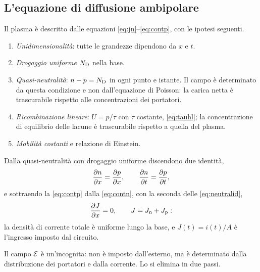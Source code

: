 \documentclass[10pt,a4paper]{scrartcl}
\let\newcommand\pdvaluedefine
\newcommand{\Ef}{\mathcal{E}}                 %
\newcommand{\ND}{N_\mathrm{D}}
\newcommand{\Jn}{J_\mathrm{n}}
\newcommand{\Jp}{J_\mathrm{p}}
\newcommand{\dpar}[2]{\frac{\partial #1}{\partial #2}}
\begin{document}
\subsection{L'equazione di diffusione ambipolare}
\label{sec:ambipolar}
Il plasma è descritto dalle equazioni \eqref{eq:jn}--\eqref{eq:contp}, con le ipotesi seguenti.
\begin{enumerate}
\item \emph{Unidimensionalità}: tutte le grandezze dipendono da $x$ e $t$.
\item \emph{Drogaggio uniforme} $\ND$ nella base.
\item \emph{Quasi-neutralità}: $n - p = \ND$ in ogni punto e istante. Il campo è determinato da questa condizione e non dall'equazione di Poisson: la carica netta è trascurabile rispetto alle concentrazioni dei portatori.
\item \emph{Ricombinazione lineare}: $U = p/\tau$ con $\tau$ costante, \eqref{eq:tauhl}; la concentrazione di equilibrio delle lacune è trascurabile rispetto a quella del plasma.
\item \emph{Mobilità costanti} e relazione di Einstein.
\end{enumerate}
Dalla quasi-neutralità con drogaggio uniforme discendono due identità,
\begin{equation}
\dpar{n}{x} = \dpar{p}{x} , \qquad \dpar{n}{t} = \dpar{p}{t} ,
\label{eq:neutralid}
\end{equation}
e sottraendo la \eqref{eq:contp} dalla \eqref{eq:contn}, con la seconda delle \eqref{eq:neutralid},
\begin{equation}
\dpar{J}{x} = 0 , \qquad J = \Jn + \Jp :
\label{eq:juniform}
\end{equation}
la densità di corrente totale è uniforme lungo la base, e $J(t) = i(t)/A$ è l'ingresso imposto dal circuito.

Il campo $\Ef$ è un'incognita: non è imposto dall'esterno, ma è determinato dalla distribuzione dei portatori e dalla corrente. Lo si elimina in due passi.
\end{document}

